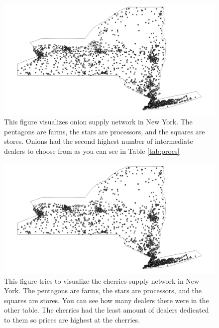 \documentclass{report}
\begin{document}

\begin{figure}
\centering
\begin{framed}
\includegraphics[scale=.50]{network_49}
\caption{This figure visualizes onion supply network in New York. The pentagons are farms, the stars are processors, and the squares are stores. Onions had the second highest number of intermediate dealers to choose from as you can see in Table \ref{tab:procs}}
\label{fig:network_49}
\end{framed}
\end{figure}

\begin{figure}
\centering
\begin{framed}
\includegraphics[scale=.50]{network_66}
\caption{This figure tries to visualize the cherries supply network in New York. The pentagons are farms, the stars are processors, and the squares are stores. You can see how many dealers there were in the other table. The cherries had the least amount of dealers dedicated to them so prices are highest at the cherries. }
\label{fig:network_66}
\end{framed}
\end{figure}
\end{document}
